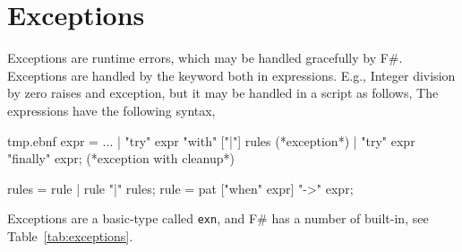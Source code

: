 \chapter{Exceptions}
\label{chap:exceptions}
Exceptions are runtime errors, which may be handled gracefully by F\#. Exceptions are handled by the  keyword both in expressions. E.g., Integer division by zero raises and exception, but it may be handled in a script as follows,
%
%
The  expressions have the following syntax,
%
\begin{verbatimwrite}{tmp.ebnf}
expr = ... 
  | "try" expr "with" ["|"] rules (*exception*)
  | "try" expr "finally" expr; (*exception with cleanup*)

rules = rule | rule "|" rules;
rule = pat ["when" expr] "->" expr;
\end{verbatimwrite}
%
Exceptions are a basic-type called \lstinline!exn!, and F\# has a number of built-in, see Table~\ref{tab:exceptions}. 
